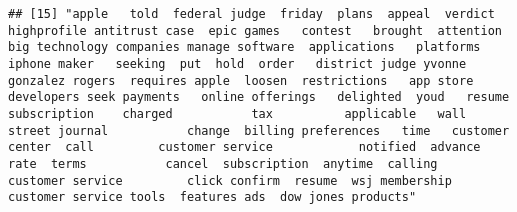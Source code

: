 \documentclass[
]{article}
\begin{document}
\begin{verbatim}
## [15] "apple   told  federal judge  friday  plans  appeal  verdict   highprofile antitrust case  epic games   contest   brought  attention   big technology companies manage software  applications   platforms  iphone maker   seeking  put  hold  order   district judge yvonne gonzalez rogers  requires apple  loosen  restrictions   app store developers seek payments   online offerings   delighted  youd   resume  subscription    charged           tax          applicable   wall street journal           change  billing preferences   time   customer center  call         customer service            notified  advance     rate  terms           cancel  subscription  anytime  calling         customer service         click confirm  resume  wsj membership customer service tools  features ads  dow jones products"                                                                                                                                                                                                                                                                                                                                                                                                                                                                                                                                                                                                                                                                                                                                                                                                                                                                                                                                                                                                                                                                                                                                                                                                                                                                                                                                                                                                                                                                                                                                                                                                                                                                                                                                                                                                                                                                                                                                                                                                                                                                                                                                                                                                                                                                                                                                                                                                                                                                                                                                                                                                             
\end{verbatim}
\end{document}
